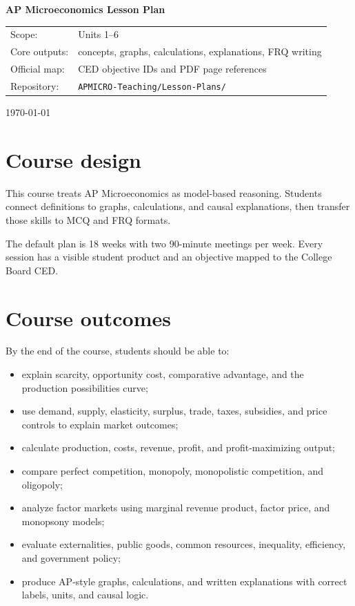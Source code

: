 \documentclass[11pt,a4paper]{article}
\newcommand{\codepath}[1]{\texttt{\small #1}}
\begin{document}
\begin{titlepage}\centering\vspace*{2cm}
{\Huge\bfseries AP Microeconomics Lesson Plan\par}\vspace{0.5cm}{\LARGE 36-session course framework and session design\par}
\vspace{1cm}{\large 18 weeks \textperiodcentered 2 meetings per week \textperiodcentered 90 minutes per meeting\par}
\vspace{0.5cm}{\large English edition\par}\vfill
\begin{tabular}{ll}Scope: & Units 1--6\\Core outputs: & concepts, graphs, calculations, explanations, FRQ writing\\Official map: & CED objective IDs and PDF page references\\Repository: & \codepath{APMICRO-Teaching/Lesson-Plans/}\\\end{tabular}
\vfill{\large \today\par}\end{titlepage}
\tableofcontents\newpage
\section{Course design}
This course treats AP Microeconomics as model-based reasoning. Students connect definitions to graphs, calculations, and causal explanations, then transfer those skills to MCQ and FRQ formats.

The default plan is 18 weeks with two 90-minute meetings per week. Every session has a visible student product and an objective mapped to the College Board CED.

\section{Course outcomes}
By the end of the course, students should be able to:
\begin{itemize}[leftmargin=2em]
\item explain scarcity, opportunity cost, comparative advantage, and the production possibilities curve;
\item use demand, supply, elasticity, surplus, trade, taxes, subsidies, and price controls to explain market outcomes;
\item calculate production, costs, revenue, profit, and profit-maximizing output;
\item compare perfect competition, monopoly, monopolistic competition, and oligopoly;
\item analyze factor markets using marginal revenue product, factor price, and monopsony models;
\item evaluate externalities, public goods, common resources, inequality, efficiency, and government policy;
\item produce AP-style graphs, calculations, and written explanations with correct labels, units, and causal logic.
\end{itemize}
\end{document}
